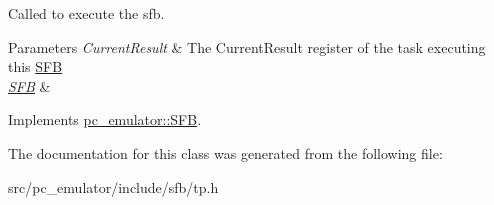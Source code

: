 Called to execute the sfb. 


\begin{DoxyParams}{Parameters}
{\em Current\+Result} & The Current\+Result register of the task executing this \hyperlink{classpc__emulator_1_1SFB}{S\+FB} \\
\hline
{\em \hyperlink{classpc__emulator_1_1SFB}{S\+FB}} & \\
\hline
\end{DoxyParams}


Implements \hyperlink{classpc__emulator_1_1SFB_a203227dee0fcab88b8e9d1055c29d958}{pc\+\_\+emulator\+::\+S\+FB}.



The documentation for this class was generated from the following file\+:\begin{DoxyCompactItemize}
\item 
src/pc\+\_\+emulator/include/sfb/tp.\+h\end{DoxyCompactItemize}

